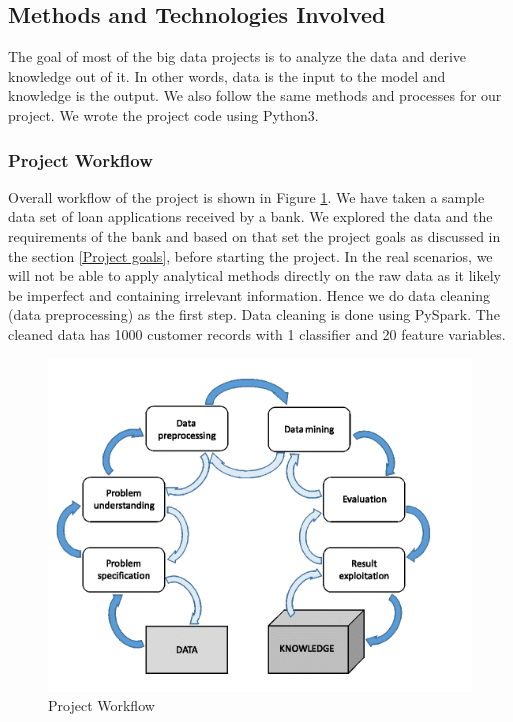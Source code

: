 \documentclass[sigconf]{acmart}
\begin{document}
\subsection{Methods and Technologies Involved}\label{Methods and Technologies Involved}

The goal of most of the big data projects is to analyze the data and derive knowledge out of it. In other words, data is the input to the model and knowledge is the output. We also follow the same methods and processes for our project. We wrote the project code using Python3. 

\subsubsection{Project Workflow}

Overall workflow of the project is shown in Figure \ref{fig:Figure1}. 
We have taken a sample data set of loan applications received by a bank. We explored the data and the requirements of the bank and based on that set the project goals as discussed in the section \ref{Project goals}, before starting the project. In the real scenarios, we will not be able to apply analytical methods directly on the raw data as it likely be imperfect and containing irrelevant information. Hence we do data cleaning (data preprocessing) as the first step. Data cleaning is done using PySpark. The cleaned data has 1000 customer records with 1 classifier and 20 feature variables.

\begin{figure}[htb]
  \centering
  \includegraphics[width=1.0\columnwidth]{images/Figure1.png}
  \caption{Project Workflow
  \cite{preprocessing}}
  \label{fig:Figure1} 
\end{figure}
\end{document}
